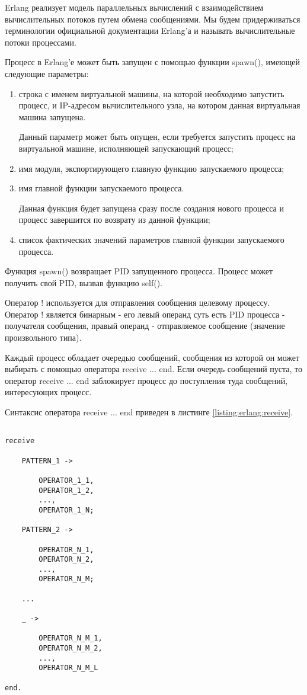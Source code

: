 Erlang реализует модель параллельных вычислений с взаимодействием вычислительных потоков путем обмена сообщениями. Мы будем придерживаться терминологии официальной документации Erlang'а и называть вычислительные потоки процессами.

Процесс в Erlang'е может быть запущен с помощью функции spawn(), имеющей следующие параметры:

\begin{enumerate}

	\item строка с именем виртуальной машины, на которой необходимо запустить процесс, и IP-адресом вычислительного узла, на котором данная виртуальная машина запущена.

	Данный параметр может быть опущен, если требуется запустить процесс на виртуальной машине, исполняющей запускающий процесс;

	\item имя модуля, экспортирующего главную функцию запускаемого процесса;

	\item имя главной функции запускаемого процесса.

	Данная функция будет запущена сразу после создания нового процесса и процесс завершится по возврату из данной функции;

	\item список фактических значений параметров главной функции запускаемого процесса.

\end{enumerate}

Функция spawn() возвращает PID запущенного процесса. Процесс может получить свой PID, вызвав функцию self().

Оператор ! используется для отправления сообщения целевому процессу. Оператор ! является бинарным - его левый операнд суть есть PID процесса - получателя сообщения, правый операнд - отправляемое сообщение (значение произвольного типа).

Каждый процесс обладает очередью сообщений, сообщения из которой он может выбирать с помощью оператора receive ... end. Если очередь сообщений пуста, то оператор receive ... end заблокирует процесс до поступления туда сообщений, интересующих процесс.

Синтаксис оператора receive ... end приведен в листинге \ref{listing:erlang:receive}.

\begin{lstlisting}

receive

	PATTERN_1 ->

		OPERATOR_1_1,
		OPERATOR_1_2,
		...,
		OPERATOR_1_N;

	PATTERN_2 ->

		OPERATOR_N_1,
		OPERATOR_N_2,
		...,
		OPERATOR_N_M;

	...

	_ ->

		OPERATOR_N_M_1,
		OPERATOR_N_M_2,
		...,
		OPERATOR_N_M_L

end.

\end{lstlisting}
\mylistingend

